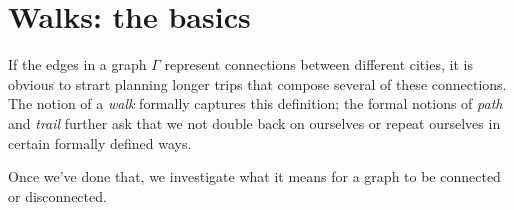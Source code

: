 \documentclass[10pt,]{book}
\theoremstyle{plain}
\theoremstyle{definition}
\theoremstyle{definition}
\theoremstyle{definition}
\begin{document}
\section[{Walks: the basics}]{Walks: the basics}\label{s_walks_basics}
\hypertarget{p-73}{}%
If the edges in a graph \(\Gamma\) represent connections between different cities, it is obvious to strart planning longer trips that compose several of these connections.  The notion of a \emph{walk} formally captures this definition; the formal notions of \emph{path} and \emph{trail} further ask that we not double back on ourselves or repeat ourselves in certain formally defined ways.%
 \par
\hypertarget{p-74}{}%
Once we've done that, we investigate what it means for a graph to be connected or disconnected.%
\typeout{************************************************}
\typeout{************************************************}
\end{document}
